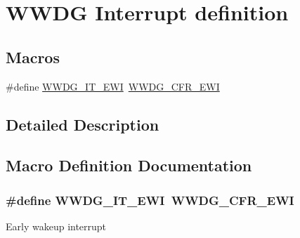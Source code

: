 \hypertarget{group___w_w_d_g___interrupt__definition}{}\section{W\+W\+DG Interrupt definition}
\label{group___w_w_d_g___interrupt__definition}
\subsection*{Macros}
\begin{DoxyCompactItemize}
\item 
\#define \hyperlink{group___w_w_d_g___interrupt__definition_gaf2659a7ce6e4edd7c6d1b537dbc33362}{W\+W\+D\+G\+\_\+\+I\+T\+\_\+\+E\+WI}~\hyperlink{group___peripheral___registers___bits___definition_ga931941dc5d795502371ac5dd8fbac1e9}{W\+W\+D\+G\+\_\+\+C\+F\+R\+\_\+\+E\+WI}
\end{DoxyCompactItemize}


\subsection{Detailed Description}


\subsection{Macro Definition Documentation}
\subsubsection[{\texorpdfstring{W\+W\+D\+G\+\_\+\+I\+T\+\_\+\+E\+WI}{WWDG_IT_EWI}}]{\setlength{\rightskip}{0pt plus 5cm}\#define W\+W\+D\+G\+\_\+\+I\+T\+\_\+\+E\+WI~{\bf W\+W\+D\+G\+\_\+\+C\+F\+R\+\_\+\+E\+WI}}\hypertarget{group___w_w_d_g___interrupt__definition_gaf2659a7ce6e4edd7c6d1b537dbc33362}{}\label{group___w_w_d_g___interrupt__definition_gaf2659a7ce6e4edd7c6d1b537dbc33362}
Early wakeup interrupt 